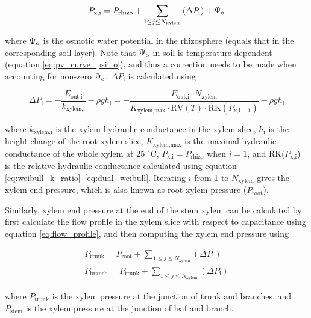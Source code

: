 \documentclass[twoside,10pt]{report}
\begin{document}
\begin{equation}
    P_\text{x,i} = P_\text{rhizo} + \sum_{1 \leq j \leq N_\text{xylem}} \left( \Delta P_\text{i} \right) + \Psi_\text{o}
\end{equation}

\par \noindent where $\Psi_\text{o}$ is the osmotic water potential in the rhizosphere (equals that in the corresponding soil layer). Note that $\Psi_\text{o}$ in soil is temperature dependent (equation \ref{eq:pv_curve_psi_o}), and thus a correction needs to be made when accounting for non-zero $\Psi_\text{o}$. $\Delta P_\text{i}$ is calculated using

\begin{equation}
    \Delta P_\text{i} =
        -\dfrac{E_\text{out,i}}{k_\text{xylem,i}} - \rho g h_\text{i} =
        -\dfrac{E_\text{out,i} \cdot N_\text{xylem}}
               {K_\text{xylem,max} \cdot \text{RV}(T) \cdot \text{RK}(P_{\text{x,i}-1})} - \rho g h_\text{i}
\end{equation}

\par \noindent where $k_\text{xylem,i}$ is the xylem hydraulic conductance in the xylem slice, $h_\text{i}$ is the height change of the root xylem slice, $K_\text{xylem,max}$ is the maximal hydraulic conductance of the whole xylem at 25 $^\circ$C, $P_\text{x,i} = P_\text{rhizo}$ when $i = 1$, and RK($P_\text{x,i}$) is the relative hydraulic conductance calculated using equation \ref{eq:weibull_k_ratio}--\ref{eq:dual_weibull}. Iterating $i$ from 1 to $N_\text{xylem}$ gives the xylem end pressure, which is also known as root xylem pressure ($P_\text{root}$).

\par Similarly, xylem end pressure at the end of the stem xylem can be calculated by first calculate the flow profile in the xylem slice with respect to capacitance using equation \ref{eq:flow_profile}, and then computing the xylem end pressure using

\begin{align}
    P_\text{trunk} = P_\text{root} + \sum_{1 \leq j \leq N_\text{xylem}} \left( \Delta P_\text{i} \right) \\
    P_\text{branch} = P_\text{trunk} + \sum_{1 \leq j \leq N_\text{xylem}} \left( \Delta P_\text{i} \right)
\end{align}

\par \noindent where $P_\text{trunk}$ is the xylem pressure at the junction of trunk and branches, and $P_\text{stem}$ is the xylem pressure at the junction of leaf and branch.
\end{document}
